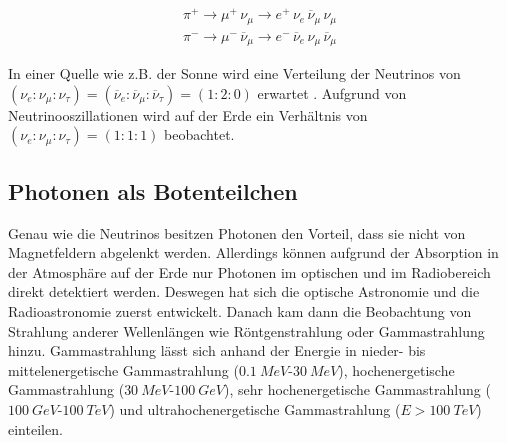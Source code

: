 \begin{equation*}
 \begin{aligned}
 \pi^+ \rightarrow \mu^+ \, \nu_{\mu} \rightarrow e^+ \, \nu_e \, \overline{\nu}_{\mu} \, \nu_{\mu} \\ 
 \pi^- \rightarrow \mu^- \, \overline{\nu}_{\mu} \rightarrow e^- \, \overline{\nu}_e \, \nu_{\mu} \, \overline{\nu}_{\mu}
 \end{aligned}
\end{equation*}


In einer Quelle wie z.B. der Sonne wird eine Verteilung der Neutrinos von $(\nu_e:\nu_{\mu}:\nu_{\tau})=(\overline{\nu}_e:\overline{\nu}_{\mu}:\overline{\nu}_{\tau})=(1:2:0)$ erwartet \cite{NeutrinoOszillation}.
Aufgrund von Neutrinooszillationen wird auf der Erde ein Verhältnis von $(\nu_e:\nu_{\mu}:\nu_{\tau})=(1:1:1)$ \cite{NeutrinoOszillation} beobachtet.



\subsection{Photonen als Botenteilchen}
\label{subsec:Photonen}
Genau wie die Neutrinos besitzen Photonen den Vorteil, dass sie nicht von Magnetfeldern abgelenkt werden.
Allerdings können aufgrund der Absorption in der Atmosphäre auf der Erde nur Photonen im optischen und im Radiobereich direkt detektiert werden.
Deswegen hat sich die optische Astronomie und die Radioastronomie zuerst entwickelt. 
Danach kam dann die Beobachtung von Strahlung anderer Wellenlängen wie Röntgenstrahlung oder Gammastrahlung hinzu.
Gammastrahlung lässt sich anhand der Energie in nieder- bis mittelenergetische Gammastrahlung ($\SI{0,1}{MeV}$-$\SI{30}{MeV}$), hochenergetische Gammastrahlung ($\SI{30}{MeV}$-$\SI{100}{GeV}$), sehr hochenergetische Gammastrahlung ($\SI{100}{GeV}$-$\SI{100}{TeV}$) und ultrahochenergetische Gammastrahlung ($E>\SI{100}{TeV}$) einteilen.\cite{Weekes}


